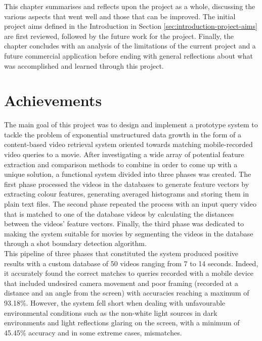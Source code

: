 This chapter summarises and reflects upon the project as a whole, discussing the various aspects that went well and those that can be improved. The initial project aims defined in the Introduction in Section \ref{sec:introduction-project-aims} are first reviewed, followed by the future work for the project. Finally, the chapter concludes with an analysis of the limitations of the current project and a future commercial application before ending with general reflections about what was accomplished and learned through this project.


\section{Achievements}

The main goal of this project was to design and implement a prototype system to tackle the problem of exponential unstructured data growth in the form of a content-based video retrieval system oriented towards matching mobile-recorded video queries to a movie. After investigating a wide array of potential feature extraction and comparison methods to combine in order to come up with a unique solution, a functional system divided into three phases was created. The first phase processed the videos in the databases to generate feature vectors by extracting colour features, generating averaged histograms and storing them in plain text files. The second phase repeated the process with an input query video that is matched to one of the database videos by calculating the distances between the videos' feature vectors. Finally, the third phase was dedicated to making the system suitable for movies by segmenting the videos in the database through a shot boundary detection algorithm.\\

This pipeline of three phases that constituted the system produced positive results with a custom database of 50 videos ranging from 7 to 14 seconds. Indeed, it accurately found the correct matches to queries recorded with a mobile device that included undesired camera movement and poor framing (recorded at a distance and an angle from the screen) with accuracies reaching a maximum of 93.18\%. However, the system fell short when dealing with unfavourable environmental conditions such as the non-white light sources in dark environments and light reflections glaring on the screen, with a minimum of 45.45\% accuracy and in some extreme cases, mismatches.\\

